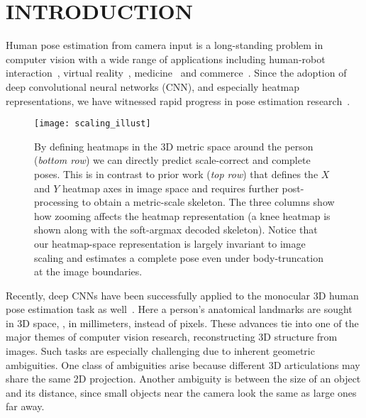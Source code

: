 \section{\uppercase{Introduction}}
Human pose estimation from camera input is a long-standing problem in computer vision with a wide range of applications including human-robot interaction~\cite{Zimmermann18ICRA}, virtual reality~\cite{Alldieck2018CVPR}, medicine~\cite{Belagiannis16MAVIS,Srivastav18Arxiv} and commerce~\cite{Neverova18ECCV}.
Since the adoption of deep convolutional neural networks (CNN), and especially heatmap representations, we have witnessed rapid progress in pose estimation research~\cite{Newell16ECCV,Yang17CVPR,Ke18ECCV}.
\begin{figure}[t]
\centering
\texttt{[image: scaling\_illust]}\\
\caption{By defining heatmaps in the 3D metric space around the person (\emph{bottom row}) we can directly predict scale-correct and complete poses.
This is in contrast to prior work (\emph{top row}) that defines the $X$ and $Y$ heatmap axes in image space and requires further post-processing to obtain a metric-scale skeleton.
The three columns show how zooming affects the heatmap representation (a knee heatmap is shown along with the soft-argmax decoded skeleton).
Notice that our heatmap-space representation is largely invariant to image scaling and estimates a complete pose even under body-truncation at the image boundaries.
}
\label{fig:volume_visu}
\end{figure}
Recently, deep CNNs have been successfully applied to the monocular 3D human pose estimation task as well~\cite{Martinez17ICCV,Mehta17TOG,Zhou17ICCV,Luo18BMVC,Nibali19WACV}.
Here a person's anatomical landmarks are sought in 3D space, \ie, in millimeters, instead of pixels.
These advances tie into one of the major themes of computer vision research, reconstructing 3D structure from images.
Such tasks are especially challenging due to inherent geometric ambiguities.
One class of ambiguities arise because different 3D articulations may share the same 2D projection.
Another ambiguity is between the size of an object and its distance, since small objects near the camera look the same as large ones far away.

